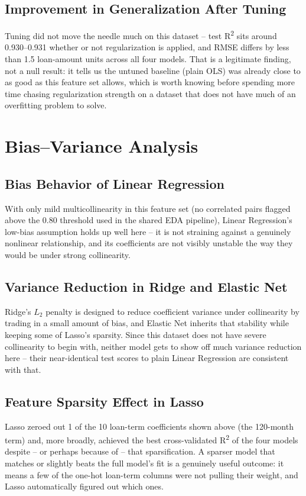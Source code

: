\documentclass[11pt,a4paper]{article}
\begin{document}
\subsection{Improvement in Generalization After Tuning}
Tuning did not move the needle much on this dataset -- test R\textsuperscript{2} sits around 0.930--0.931 whether or not regularization is applied, and RMSE differs by less than 1.5 loan-amount units across all four models. That is a legitimate finding, not a null result: it tells us the untuned baseline (plain OLS) was already close to as good as this feature set allows, which is worth knowing before spending more time chasing regularization strength on a dataset that does not have much of an overfitting problem to solve.

\section{Bias--Variance Analysis}

\subsection{Bias Behavior of Linear Regression}
With only mild multicollinearity in this feature set (no correlated pairs flagged above the 0.80 threshold used in the shared EDA pipeline), Linear Regression's low-bias assumption holds up well here -- it is not straining against a genuinely nonlinear relationship, and its coefficients are not visibly unstable the way they would be under strong collinearity.

\subsection{Variance Reduction in Ridge and Elastic Net}
Ridge's $L_2$ penalty is designed to reduce coefficient variance under collinearity by trading in a small amount of bias, and Elastic Net inherits that stability while keeping some of Lasso's sparsity. Since this dataset does not have severe collinearity to begin with, neither model gets to show off much variance reduction here -- their near-identical test scores to plain Linear Regression are consistent with that.

\subsection{Feature Sparsity Effect in Lasso}
Lasso zeroed out 1 of the 10 loan-term coefficients shown above (the 120-month term) and, more broadly, achieved the best cross-validated R\textsuperscript{2} of the four models despite -- or perhaps because of -- that sparsification. A sparser model that matches or slightly beats the full model's fit is a genuinely useful outcome: it means a few of the one-hot loan-term columns were not pulling their weight, and Lasso automatically figured out which ones.
\end{document}
